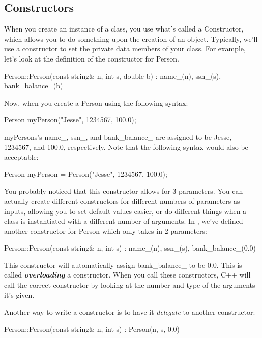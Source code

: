 \documentclass{tufte-handout}
\begin{document}
\subsection{Constructors}
When you create an instance of a class, you use what's called a Constructor, which allows you to do something upon the creation of an object.
Typically, we'll use a constructor to set the private data members of your class.
For example, let's look at the definition of the constructor for Person.
\begin{Code}
Person::Person(const string& n, int s, double b)
        : name_(n), ssn_(s), bank_balance_(b)
{ }
\end{Code}
Now, when you create a Person using the following syntax:
\begin{Code}
    Person myPerson("Jesse", 1234567, 100.0);
\end{Code}

myPersons's name\_, ssn\_, and bank\_balance\_ are assigned to be Jesse, 1234567, and 100.0, respectively. 
Note that the following syntax would also be acceptable:
\begin{Code}
    Person myPerson = Person("Jesse", 1234567, 100.0);
\end{Code}

You probably noticed that this constructor allows for 3 parameters.
You can actually create different constructors for different numbers of parameters as inputs, allowing you to set default values easier, or do different things when a class is instantiated with a different number of arguments.
In , we've defined another constructor for Person which only takes in 2 parameters:
\begin{Code}
Person::Person(const string& n, int s) 
        : name_(n), ssn_(s), bank_balance_(0.0)
{ }
\end{Code}
This constructor will automatically assign bank\_balance\_ to be 0.0.
This is called \textit{\textbf{overloading}} a constructor.
When you call these constructors, C++ will call the correct constructor by looking at the number and type of the arguments it's given.

Another way to write a constructor is to have it \emph{delegate} to
another constructor:

\begin{Code}
Person::Person(const string& n, int s) 
        : Person(n, s, 0.0)
{ }
\end{Code}
\end{document}
